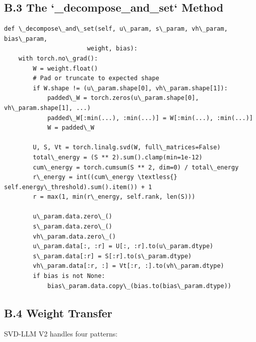 \subsection{B.3 The `\_decompose\_and\_set` Method}

\begin{lstlisting}
def \_decompose\_and\_set(self, u\_param, s\_param, vh\_param, bias\_param,
                       weight, bias):
    with torch.no\_grad():
        W = weight.float()
        # Pad or truncate to expected shape
        if W.shape != (u\_param.shape[0], vh\_param.shape[1]):
            padded\_W = torch.zeros(u\_param.shape[0], vh\_param.shape[1], ...)
            padded\_W[:min(...), :min(...)] = W[:min(...), :min(...)]
            W = padded\_W
        
        U, S, Vt = torch.linalg.svd(W, full\_matrices=False)
        total\_energy = (S ** 2).sum().clamp(min=1e-12)
        cum\_energy = torch.cumsum(S ** 2, dim=0) / total\_energy
        r\_energy = int((cum\_energy \textless{} self.energy\_threshold).sum().item()) + 1
        r = max(1, min(r\_energy, self.rank, len(S)))
        
        u\_param.data.zero\_()
        s\_param.data.zero\_()
        vh\_param.data.zero\_()
        u\_param.data[:, :r] = U[:, :r].to(u\_param.dtype)
        s\_param.data[:r] = S[:r].to(s\_param.dtype)
        vh\_param.data[:r, :] = Vt[:r, :].to(vh\_param.dtype)
        if bias is not None:
            bias\_param.data.copy\_(bias.to(bias\_param.dtype))
\end{lstlisting}

\subsection{B.4 Weight Transfer}

SVD-LLM V2 handles four patterns:

